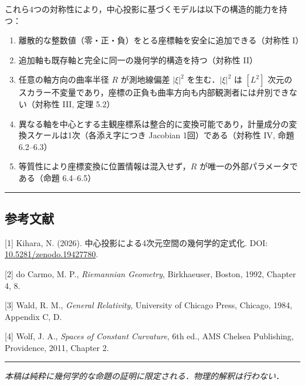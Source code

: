 \documentclass[a4paper,11pt]{ltjsarticle}
\theoremstyle{definition}
\providecommand{\tightlist}{\setlength{\itemsep}{0pt}\setlength{\parskip}{0pt}}
\begin{document}
これら4つの対称性により，中心投影に基づくモデルは以下の構造的能力を持つ：

\begin{enumerate}
\def\labelenumi{\arabic{enumi}.}
\tightlist
\item
  離散的な整数値（零・正・負）をとる座標軸を安全に追加できる（対称性 I）
\item
  追加軸も既存軸と完全に同一の幾何学的構造を持つ（対称性 II）
\item
  任意の軸方向の曲率半径 \(R\) が測地線偏差 \(|\xi|^2\) を生む．\(|\xi|^2\) は \([L^2]\) 次元のスカラー不変量であり，座標の正負も曲率方向も内部観測者には弁別できない（対称性 III, 定理 5.2）
\item
  異なる軸を中心とする主観座標系は整合的に変換可能であり，計量成分の変換スケールは1次（各添え字につき Jacobian 1回）である（対称性 IV, 命題 6.2--6.3）
\item
  等質性により座標変換に位置情報は混入せず，\(R\) が唯一の外部パラメータである（命題 6.4--6.5）
\end{enumerate}

\begin{center}\rule{0.5\linewidth}{0.5pt}\end{center}

\subsection{参考文献}\label{ux53c2ux8003ux6587ux732e}

{[}1{]} Kihara, N. (2026). 中心投影による4次元空間の幾何学的定式化. DOI: \href{https://doi.org/10.5281/zenodo.19427780}{10.5281/zenodo.19427780}.

{[}2{]} do Carmo, M. P., \emph{Riemannian Geometry}, Birkhaeuser, Boston, 1992, Chapter 4, 8.

{[}3{]} Wald, R. M., \emph{General Relativity}, University of Chicago Press, Chicago, 1984, Appendix C, D.

{[}4{]} Wolf, J. A., \emph{Spaces of Constant Curvature}, 6th ed., AMS Chelsea Publishing, Providence, 2011, Chapter 2.

\begin{center}\rule{0.5\linewidth}{0.5pt}\end{center}

\emph{本稿は純粋に幾何学的な命題の証明に限定される．物理的解釈は行わない．}
\end{document}
